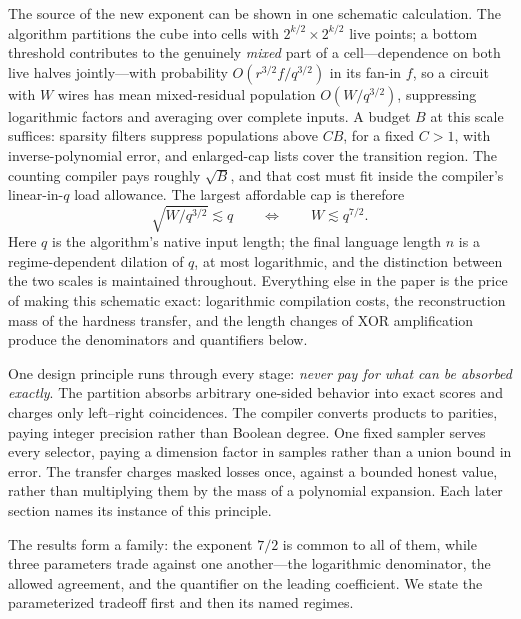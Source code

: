 \documentclass[11pt,letterpaper]{article}
\theoremstyle{definition}
\theoremstyle{remark}
\begin{document}
The source of the new exponent can be shown in one schematic
calculation. The algorithm partitions the cube into cells with
$2^{k/2}\times2^{k/2}$ live points; a bottom threshold contributes to
the genuinely \emph{mixed} part of a cell---dependence on both live
halves jointly---with probability $O(r^{3/2}f/q^{3/2})$ in its fan-in
$f$, so a circuit with $W$ wires has mean mixed-residual population
$O(W/q^{3/2})$, suppressing logarithmic factors and averaging over
complete inputs. A budget $B$ at this scale suffices: sparsity filters
suppress populations above $CB$, for a fixed $C>1$, with
inverse-polynomial error, and enlarged-cap lists cover the transition
region. The counting compiler pays roughly $\sqrt B$, and that cost
must fit inside the compiler's linear-in-$q$ load allowance. The
largest affordable cap is therefore
\[
\sqrt{W/q^{3/2}}\lesssim q
\qquad\Longleftrightarrow\qquad
W\lesssim q^{7/2}.
\]
Here $q$ is the algorithm's native input length; the final language
length $n$ is a regime-dependent dilation of $q$, at most logarithmic,
and the distinction between the two scales is maintained throughout.
Everything else in the paper is the price of
making this schematic exact: logarithmic compilation costs, the
reconstruction mass of the hardness transfer, and the length changes
of XOR amplification produce the denominators and quantifiers below.

One design principle runs through every stage: \emph{never pay for
what can be absorbed exactly}. The partition absorbs arbitrary
one-sided behavior into exact scores and charges only left--right
coincidences. The compiler converts products to parities, paying
integer precision rather than Boolean degree. One fixed sampler
serves every selector, paying a dimension factor in samples rather
than a union bound in error. The transfer charges masked losses once,
against a bounded honest value, rather than multiplying them by the
mass of a polynomial expansion. Each later section names its instance
of this principle.

The results form a family: the exponent $7/2$ is common to all of
them, while three parameters trade against one another---the
logarithmic denominator, the allowed agreement, and the quantifier on
the leading coefficient. We state the parameterized tradeoff first
and then its named regimes.
\end{document}
